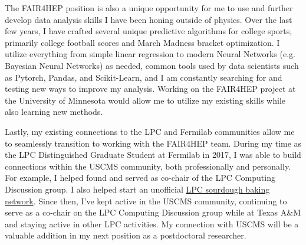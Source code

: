 \documentclass[11pt]{article}
\begin{document}

The FAIR4HEP position is also a unique opportunity for me to use and further develop data analysis skills I have been honing outside of physics. Over the last few years, I have crafted several unique predictive algorithms for college sports, primarily college football scores and March Madness bracket optimization. I utilize everything from simple linear regression to modern Neural Networks (e.g. Bayesian Neural Networks) as needed, common tools used by data scientists such as Pytorch, Pandas, and Scikit-Learn, and  I am constantly searching for and testing new ways to improve my analysis. Working on the FAIR4HEP project at the University of Minnesota would allow me to utilize my existing skills while also learning new methods.


Lastly, my existing connections to the LPC and Fermilab communities allow me to seamlessly transition to working with the FAIR4HEP team. During my time as the LPC Distinguished Graduate Student at Fermilab in 2017, I was able to build connections within the USCMS community, both professionally and personally. For example, I helped found and served as co-chair of the LPC Computing Discussion group. I also helped start an unofficial \href{https://www.symmetrymagazine.org/article/the-sourdough-starter-physics-family}{LPC sourdough baking network}. Since then, I've kept active in the USCMS community, continuing to serve as a co-chair on the LPC Computing Discussion group while at Texas A\&M and staying active in other LPC activities. My connection with USCMS will be a valuable addition in my next position as a postdoctoral researcher. 
\end{document}
